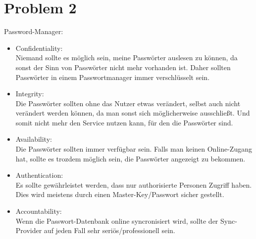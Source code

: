 \documentclass[12pt,pdftex,a4paper]{article}
\begin{document}
\section*{Problem 2}
Password-Manager:
\begin{itemize}
	\item Confidentiality:\\
	Niemand sollte es möglich sein, meine Passwörter auslesen zu können, da sonst der Sinn von Passwörter nicht mehr vorhanden ist. Daher sollten Passwörter in einem Passwortmanager immer verschlüsselt sein.
	\item Integrity:\\
	Die Passwörter sollten ohne das Nutzer etwas verändert, selbst auch nicht verändert werden können, da man sonst sich möglicherweise ausschließt. Und somit nicht mehr den Service nutzen kann, für den die Passwörter sind.
	\item Availability:\\
	Die Passwörter sollten immer verfügbar sein. Falls man keinen Online-Zugang hat, sollte es trozdem möglich sein, die Passwörter angezeigt zu bekommen.
	\item Authentication:\\
	Es sollte gewährleistet werden, dass nur authorisierte Personen Zugriff haben. Dies wird meistens durch einen Master-Key/Passwort sicher gestellt.
	\item Accountability:\\
	Wenn die Passwort-Datenbank online syncronisiert wird, sollte der Sync-Provider auf jeden Fall sehr seriös/professionell sein.
\end{itemize}
\end{document}
